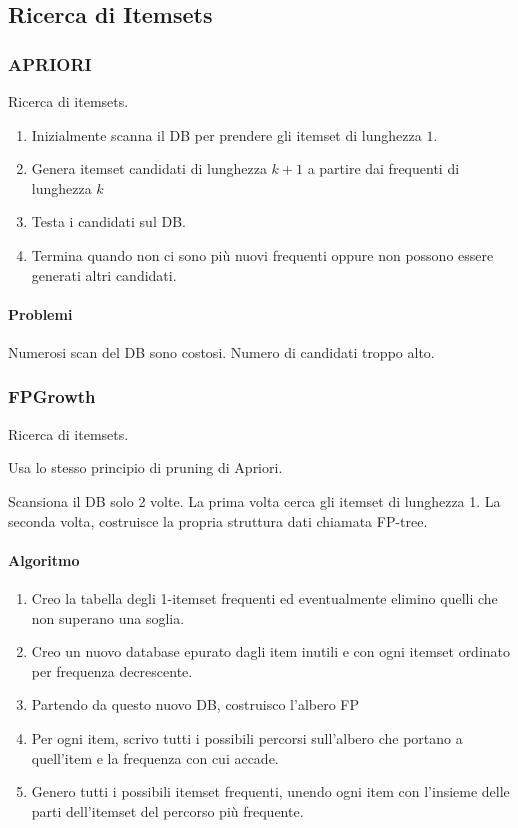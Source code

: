 \documentclass[11pt,onecolumn,a4paper,oneside]{book}
\begin{document}
\subsection{Ricerca di Itemsets}

\subsubsection{APRIORI}
Ricerca di itemsets.

\begin{enumerate}
\item Inizialmente scanna il DB per prendere gli itemset di lunghezza $1$.

\item Genera itemset candidati	di lunghezza $k+1$ a partire dai frequenti di lunghezza $k$

\item Testa i candidati sul DB.

\item Termina quando non ci sono più nuovi frequenti oppure non possono essere generati altri candidati.
\end{enumerate}

\paragraph{Problemi}
Numerosi scan del DB sono costosi. Numero di candidati troppo alto.
		
		\subsubsection{FPGrowth}
Ricerca di itemsets.

Usa lo stesso principio di pruning di Apriori.

Scansiona il DB solo 2 volte. La prima volta cerca gli itemset di lunghezza 1. La seconda volta, costruisce la propria struttura dati chiamata FP-tree.

\paragraph{Algoritmo}
\begin{enumerate}
\item Creo la tabella degli 1-itemset frequenti ed eventualmente elimino quelli che non superano una soglia.
\item Creo un nuovo database epurato dagli item inutili e con ogni itemset ordinato per frequenza decrescente.
\item Partendo da questo nuovo DB, costruisco l'albero FP
\item Per ogni item, scrivo tutti i possibili percorsi sull'albero che portano a quell'item e la frequenza con cui accade.
\item Genero tutti i possibili itemset frequenti, unendo ogni item con l'insieme delle parti dell'itemset del percorso più frequente.
\end{enumerate}
\end{document}
